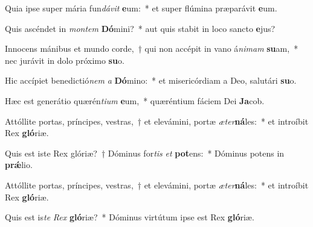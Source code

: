 \item Quia ipse super mária fun\textit{dá}\textit{vit} \textbf{e}um:~* et super flúmina præparávit \textbf{e}um.
\item Quis ascéndet in \textit{mon}\textit{tem} \textbf{Dó}mini?~* aut quis stabit in loco sancto \textbf{e}jus?
\item Innocens mánibus et mundo corde,~† qui non accépit in vano á\textit{ni}\textit{mam} \textbf{su}am,~* nec jurávit in dolo próximo \textbf{su}o.
\item Hic accípiet benedictió\textit{nem} \textit{a} \textbf{Dó}mino:~* et misericórdiam a Deo, salutári \textbf{su}o.
\item Hæc est generátio quærén\textit{ti}\textit{um} \textbf{e}um,~* quæréntium fáciem Dei \textbf{Ja}cob.
\item Attóllite portas, príncipes, vestras,~† et elevámini, portæ \textit{æ}\textit{ter}\textbf{ná}les:~* et introíbit Rex \textbf{gló}riæ.
\item Quis est iste Rex glóriæ?~† Dóminus for\textit{tis} \textit{et} \textbf{pot}ens:~* Dóminus potens in \textbf{prǽ}lio.
\item Attóllite portas, príncipes, vestras,~† et elevámini, portæ \textit{æ}\textit{ter}\textbf{ná}les:~* et introíbit Rex \textbf{gló}riæ.
\item Quis est is\textit{te} \textit{Rex} \textbf{gló}riæ?~* Dóminus virtútum ipse est Rex \textbf{gló}riæ.
